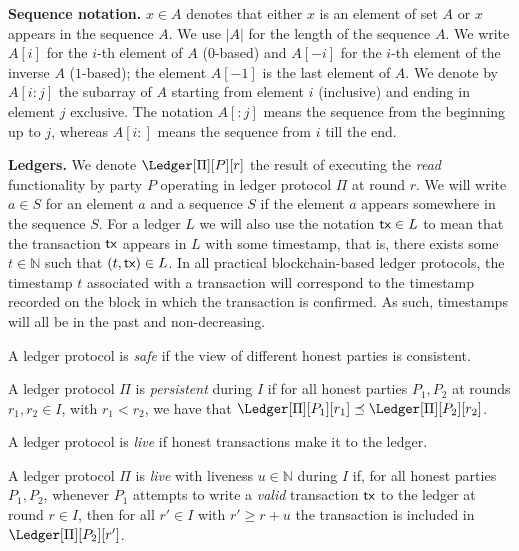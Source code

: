 \noindent
\textbf{Sequence notation.}
$x \in A$ denotes that either $x$ is an element of set $A$ or $x$
appears in the sequence $A$. We use $|A|$ for the length of the sequence $A$.
We write $A[i]$ for the $i$-th element of $A$ ($0$-based) and $A[-i]$ for the
$i$-th element of the inverse $A$ ($1$-based); the element $A[-1]$ is the last element of $A$.
We denote by $A[{i}{:}{j}]$ the subarray of $A$ starting from element $i$ (inclusive)
and ending in element $j$ exclusive. The notation $A[{:}j]$ means the sequence
from the beginning up to $j$, whereas $A[i{:}]$ means the sequence from $i$ till
the end.

\noindent
\textbf{Ledgers.}
We denote $\Ledger[\Pi][P][r]$ the result of executing the \emph{read} functionality by party $P$
operating in ledger protocol $\Pi$ at round $r$. %
We will write
$a \in S$ for an element $a$ and a sequence $S$ if the element $a$ appears somewhere in
the sequence $S$. For a ledger $L$ we will also use the notation $\textsf{tx} \in L$ to mean that
the transaction $\textsf{tx}$ appears in $L$ with some timestamp, that is, there exists some $t \in \mathbb{N}$
such that $(t, \textsf{tx}) \in L$. In all practical blockchain-based ledger protocols, the timestamp $t$
associated with a transaction will correspond to the timestamp recorded on the block in which the
transaction is confirmed. As such, timestamps will all be in the past and non-decreasing.

A ledger protocol is \emph{safe} if the view of different honest parties is consistent.

\begin{definition}[Persistence]
  A ledger protocol $\Pi$ is \emph{persistent} during $I$ if for all honest parties $P_1, P_2$ at rounds
  $r_1, r_2 \in I$, with $r_1 < r_2$,
  we have that $\Ledger[\Pi][P_1][r_1] \preceq \Ledger[\Pi][P_2][r_2]$.
\end{definition}

A ledger protocol is \emph{live} if honest transactions make it to the ledger.

\begin{definition}[Liveness]
  A ledger protocol $\Pi$ is \emph{live} with liveness $u \in \mathbb{N}$ during $I$ if,
  for all honest parties $P_1, P_2$, whenever
  $P_1$ attempts to write a \emph{valid} transaction $\textsf{tx}$ to the ledger at round $r \in I$,
  then for all $r' \in I$ with $r' \geq r + u$
  the transaction is included in $\Ledger[\Pi][P_2][r']$.
\end{definition}

